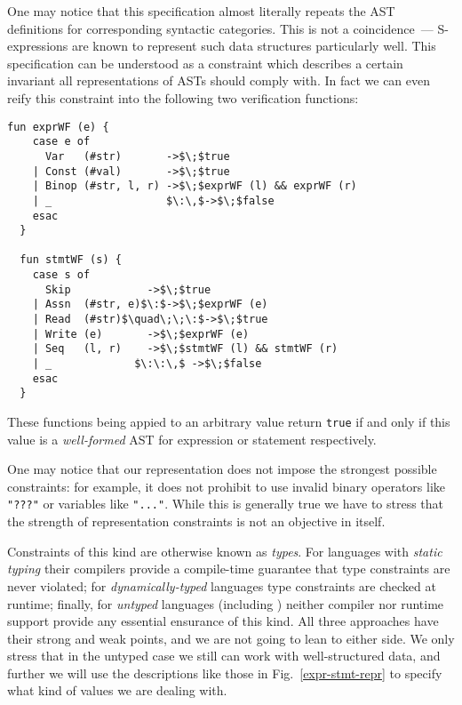 One may notice that this specification almost literally repeats the AST definitions for corresponding syntactic
categories. This is not a coincidence~--- S-expressions are known to represent such data structures particularly
well. This specification can be understood as a constraint which describes a certain invariant all representations
of ASTs should comply with. In fact we can even reify this constraint into the following two
verification functions:

\begin{lstlisting}[mathescape=true]
  fun exprWF (e) {
    case e of
      Var   (#str)       ->$\;$true
    | Const (#val)       ->$\;$true
    | Binop (#str, l, r) ->$\;$exprWF (l) && exprWF (r)  
    | _                  $\:\,$->$\;$false
    esac
  }

  fun stmtWF (s) {
    case s of
      Skip            ->$\;$true
    | Assn  (#str, e)$\:$->$\;$exprWF (e)
    | Read  (#str)$\quad\;\;\:$->$\;$true
    | Write (e)       ->$\;$exprWF (e)
    | Seq   (l, r)    ->$\;$stmtWF (l) && stmtWF (r)
    | _             $\:\:\,$ ->$\;$false
    esac
  }
\end{lstlisting}

These functions being appied to an arbitrary \lama value return \lstinline|true| if and only if this
value is a \emph{well-formed} AST for expression or statement respectively.

One may notice that our representation does not impose the strongest possible constraints: for example, it does not
prohibit to use invalid binary operators like \lstinline|"???"| or variables like \lstinline|"..."|. While
this is generally true we have to stress that the strength of representation constraints is not an objective in itself.

Constraints of this kind are otherwise known as \emph{types}. For languages with \emph{static typing} their compilers
provide a compile-time guarantee that type constraints are never violated; for \emph{dynamically-typed}
languages type constraints are checked at runtime; finally, for \emph{untyped} languages (including \lama)
neither compiler nor runtime support provide any essential ensurance of this kind. All three approaches
have their strong and weak points, and we are not going to lean to either side. We only stress that in the
untyped case we still can work with well-structured data, and further we will use the descriptions
like those in Fig.~\ref{expr-stmt-repr} to specify what kind of values we are dealing with.

